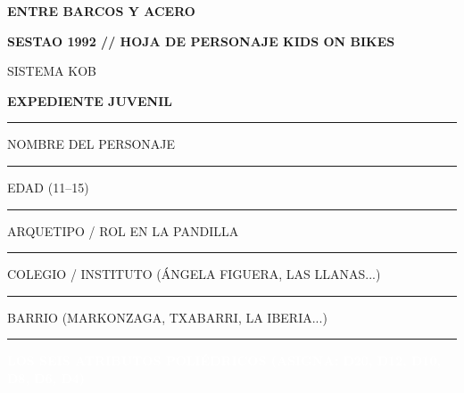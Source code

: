 \documentclass[10pt,a4paper,oneside]{book}
\newcommand{\field}[2][\linewidth]{%
  \begin{minipage}[t]{#1}
  \textcolor{InkSoft}{\terminalfont\scriptsize\MakeUppercase{#2}}\par
  \vspace{1.5mm}\textcolor{Line}{\rule{\linewidth}{0.45pt}}
  \end{minipage}}
\newcommand{\strip}[1]{%
  \vspace{1.5mm}\noindent
  \colorbox{CarbonSestao}{\parbox{\dimexpr\linewidth-2\fboxsep\relax}{%
    \textcolor{white}{\industrialfont\bfseries\small\MakeUppercase{#1}}}}\par
  \vspace{1.5mm}}
\begin{document}
\pagecolor{Paper}

\noindent
\begin{minipage}[c]{0.70\linewidth}
  {\industrialfont\bfseries\fontsize{24}{25}\selectfont\color{CarbonSestao}ENTRE BARCOS Y ACERO}\par
  \vspace{1mm}
  {\industrialfont\bfseries\small\color{OxidoSestao}SESTAO 1992 \textcolor{AceroNervion}{//} HOJA DE PERSONAJE KIDS ON BIKES}
\end{minipage}%
\hfill
\begin{minipage}[c]{0.26\linewidth}
  \raggedleft
  {\terminalfont\scriptsize\color{InkSoft}SISTEMA KOB}\par
  {\industrialfont\bfseries\large\color{AceroNervion}EXPEDIENTE JUVENIL}
\end{minipage}

\vspace{2mm}
\textcolor{OxidoSestao}{\rule{\linewidth}{1.4pt}}
\vspace{2mm}

\begin{minipage}[t]{0.38\linewidth}
  \field{Nombre del personaje}
\end{minipage}\hfill
\begin{minipage}[t]{0.18\linewidth}
  \field{Edad (11--15)}
\end{minipage}\hfill
\begin{minipage}[t]{0.38\linewidth}
  \field{Arquetipo / Rol en la pandilla}
\end{minipage}

\vspace{3mm}

\begin{minipage}[t]{0.48\linewidth}
  \field{Colegio / Instituto (Ángela Figuera, Las Llanas...)}
\end{minipage}\hfill
\begin{minipage}[t]{0.48\linewidth}
  \field{Barrio (Markonzaga, Txabarri, La Iberia...)}
\end{minipage}

\strip{Los Seis Atributos Poliédricos (Asigna: d20, d12, d10, d8, d6, d4)}
\end{document}
